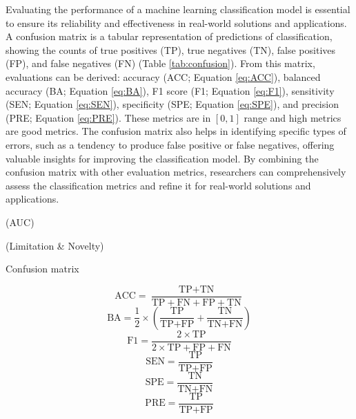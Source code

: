 \documentclass[11pt, a4paper, onecolumn, oneside]{report}
\begin{document}
        Evaluating the performance of a machine learning classification model is essential to ensure its reliability and effectiveness in real-world solutions and applications. A confusion matrix is a tabular representation of predictions of classification, showing the counts of true positives (TP), true negatives (TN), false positives (FP), and false negatives (FN) (Table \ref{tab:confusion}). From this matrix, evaluations can be derived: accuracy (ACC; Equation \ref{eq:ACC}), balanced accuracy (BA; Equation \ref{eq:BA}), F1 score (F1; Equation \ref{eq:F1}), sensitivity (SEN; Equation \ref{eq:SEN}), specificity (SPE; Equation \ref{eq:SPE}), and precision (PRE; Equation \ref{eq:PRE}). These metrics are in $[0, 1]$ range and high metrics are good metrics. The confusion matrix also helps in identifying specific types of errors, such as a tendency to produce false positive or false negatives, offering valuable insights for improving the classification model. By combining the confusion matrix with other evaluation metrics, researchers can comprehensively assess the classification metrics and refine it for real-world solutions and applications.

        (AUC)

        (Limitation \& Novelty)

        \begin{table}[p]
            \centering
            \caption{Confusion matrix}
            \label{tab:confusion}
            
        \end{table}
        \clearpage

        \begin{equation}
            \textrm{ACC} = \frac{\textrm{TP} + \textrm{TN}}{\textrm{TP} + \textrm{FN} + \textrm{FP} + \textrm{TN}}
            \label{eq:ACC}
        \end{equation}
        \begin{equation}
            \textrm{BA} = \frac{1}{2} \times (\frac{\textrm{TP}}{\textrm{TP} + \textrm{FP}} + \frac{\textrm{TN}}{\textrm{TN} + \textrm{FN}})
            \label{eq:BA}
        \end{equation}
        \begin{equation}
            \textrm{F1} = \frac{2 \times \textrm{TP}}{2 \times \textrm{TP} + \textrm{FP} + \textrm{FN}}
            \label{eq:F1}
        \end{equation}
        \begin{equation}
            \textrm{SEN} = \frac{\textrm{TP}}{\textrm{TP} + \textrm{FP}}
            \label{eq:SEN}
        \end{equation}
        \begin{equation}
            \textrm{SPE} = \frac{\textrm{TN}}{\textrm{TN} + \textrm{FN}}
            \label{eq:SPE}
        \end{equation}
        \begin{equation}
            \textrm{PRE} = \frac{\textrm{TP}}{\textrm{TP} + \textrm{FP}}
            \label{eq:PRE}
        \end{equation}
        \clearpage
    \newpage
\end{document}
